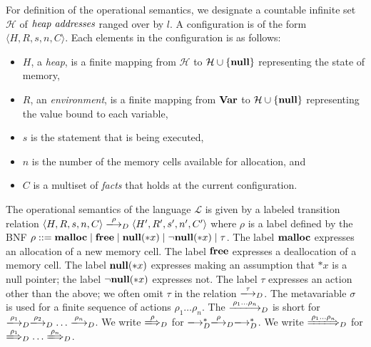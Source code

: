 For definition of the operational semantics, we designate a countable
infinite set \(\mathcal{H}\) of \(\emph{heap addresses}\) ranged over by
\(l\).  A configuration is of the form \(\langle H, R, s, n, C
\rangle\).  Each elements in the configuration is as follows:
\begin{itemize}
\item \(H\), a \emph{heap}, is a finite mapping from \(\mathcal{H}\) to
  \(\mathcal{H} \cup \{\mathbf{null}\}\) representing the state of memory,
\item \(R\), an \emph{environment}, is a finite mapping from \(\mathbf{Var}\)
  to \(\mathcal{H} \cup \{\mathbf{null}\}\) representing the value bound to
      each variable,
\item \(s\) is the statement that is being executed,
\item \(n\) is the number of the memory cells available for allocation,
      and
\item \(C\) is a multiset of \emph{facts} that holds at the current
      configuration.
\end{itemize}

The operational semantics of the language \(\mathcal{L}\) is given by a
labeled transition relation \(\langle H, R, s, n, C \rangle
\xlongrightarrow{\rho}_D \langle H', R', s', n', C' \rangle\) where
\(\rho\) is a label defined by the BNF $\rho ::= \mathbf{malloc} \mid \mathbf{free} \mid
\mathbf{null}(*x) \mid \neg\mathbf{null}(*x) \mid \tau$.  The label \(\mathbf{malloc}\) expresses an
allocation of a new memory cell.  The label \(\mathbf{free}\) expresses a
deallocation of a memory cell.  The label \(\mathbf{null}(*x)\) expresses making an
assumption that \(*x\) is a null pointer; the label $\neg\mathbf{null}(*x)$ expresses
not.  The label \(\tau\) expresses an action other than the above; we
often omit \(\tau\) in the relation \(\xlongrightarrow{\tau}_D\).  The
metavariable \(\sigma\) is used for a finite sequence of actions
\(\rho_1\dots\rho_n\). The \(\xlongrightarrow{\rho_1\dots\rho_n}_D\) is
short for
\(\xlongrightarrow{\rho_1}_D\xlongrightarrow{\rho_2}_D\dots\xlongrightarrow{\rho_n}_D\).
We write \(\xLongrightarrow{\rho}_D\) for
\(\xlongrightarrow{}_D^*\xlongrightarrow{\rho}_D\xlongrightarrow{}_D^*\).
We write \(\xLongrightarrow{\rho_1\dots\rho_n}_D\) for
\(\xLongrightarrow{\rho_1}_D\dots\xLongrightarrow{\rho_n}_D\).

